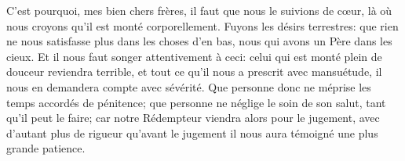 C’est pourquoi, mes bien chers frères,
	il faut que nous le suivions de cœur,
	là où nous croyons qu’il est monté corporellement.
Fuyons les désirs terrestres:
	que rien ne nous satisfasse plus dans les choses d’en bas,
	nous qui avons un Père dans les cieux.
Et il nous faut songer attentivement à ceci:
	celui qui est monté plein de douceur reviendra terrible,
	et tout ce qu’il nous a prescrit avec mansuétude,
	il nous en demandera compte avec sévérité.
Que personne donc ne méprise les temps accordés de pénitence;
	que personne ne néglige le soin de son salut, tant qu’il peut le faire;
	car notre Rédempteur viendra alors pour le jugement,
	avec d’autant plus de rigueur
		qu’avant le jugement il nous aura témoigné une plus grande patience.
